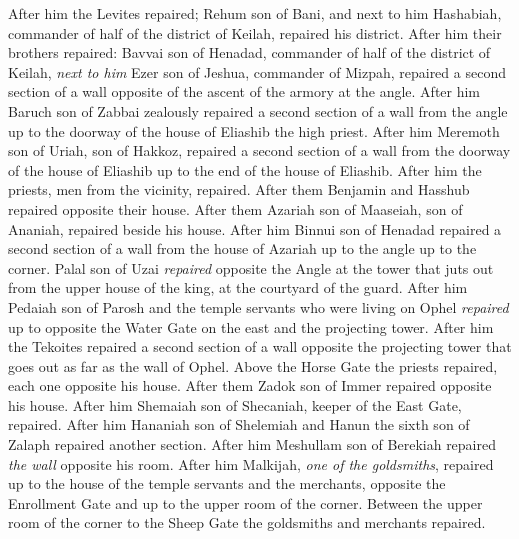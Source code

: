 \begin{biblechapter}
\verse After him the Levites repaired; Rehum son of Bani, and next to him Hashabiah, commander of half of the district of Keilah, repaired his district.
\verse After him their brothers repaired: Bavvai son of Henadad, commander of half of the district of Keilah,
\verse \textit{next to him} Ezer son of Jeshua, commander of Mizpah, repaired a second section of a wall opposite of the ascent of the armory at the angle.
\verse After him Baruch son of Zabbai zealously repaired a second section of a wall from the angle up to the doorway of the house of Eliashib the high priest.
\verse After him Meremoth son of Uriah, son of Hakkoz, repaired a second section of a wall from the doorway of the house of Eliashib up to the end of the house of Eliashib.
\verse After him the priests, men from the vicinity, repaired.
\verse After them Benjamin and Hasshub repaired opposite their house. After them Azariah son of Maaseiah, son of Ananiah, repaired beside his house.
\verse After him Binnui son of Henadad repaired a second section of a wall from the house of Azariah up to the angle up to the corner.
\verse Palal son of Uzai \textit{repaired} opposite the Angle at the tower that juts out from the upper house of the king, at the courtyard of the guard. After him Pedaiah son of Parosh
\verse and the temple servants who were living on Ophel \textit{repaired} up to opposite the Water Gate on the east and the projecting tower.
\verse After him the Tekoites repaired a second section of a wall opposite the projecting tower that goes out as far as the wall of Ophel.
\verse Above the Horse Gate the priests repaired, each one opposite his house.
\verse After them Zadok son of Immer repaired opposite his house. After him Shemaiah son of Shecaniah, keeper of the East Gate, repaired.
\verse After him Hananiah son of Shelemiah and Hanun the sixth son of Zalaph repaired another section. After him Meshullam son of Berekiah repaired \textit{the wall} opposite his room.
\verse After him Malkijah, \textit{one of the goldsmiths}, repaired up to the house of the temple servants and the merchants, opposite the Enrollment Gate and up to the upper room of the corner.
\verse Between the upper room of the corner to the Sheep Gate the goldsmiths and merchants repaired.
\end{biblechapter}

